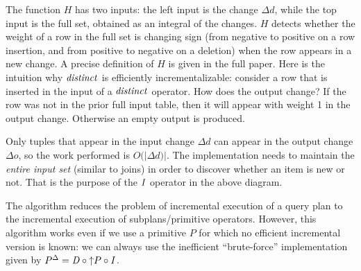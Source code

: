 The function $H$ has two inputs: the left input is the change $\Delta
d$, while the top input is the full set, obtained as an integral of
the changes.  $H$ detects whether the weight of a row in the full set
is changing sign (from negative to positive on a row insertion, and
from positive to negative on a deletion) when the row appears in a new
change.  A precise definition of $H$ is given in the full paper.  Here
is the intuition why $\mathit{distinct}$ is efficiently incrementalizable:
consider a row that is inserted in the input of a $\mathit{distinct}$
operator.  How does the output change?  If the row was not in the
prior full input table, then it will appear with weight 1 in the
output change.  Otherwise an empty output is produced.

Only
tuples that appear in the input change $\Delta d$ can appear in the
output change $\Delta o$, so the work performed is $O(|\Delta d)|$.
The implementation needs to maintain the \emph{entire input set}
(similar to joins) in order to discover whether an item is new or not.
That is the purpose of the $\mathit{I}$ operator in the above diagram.

The algorithm reduces the problem of incremental execution of a query
plan to the incremental execution of subplans/primitive operators.
However, this algorithm works even if we use a primitive $P$ for which
no efficient incremental version is known: we can always use the
inefficient ``brute-force'' implementation given by ${P}^{\Delta} = \mathit{D}
\circ {\uparrow}P \circ \mathit{I}$.




